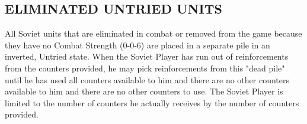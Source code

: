 \subsection{ELIMINATED UNTRIED UNITS}

All Soviet units that are eliminated in combat or removed from the game because they have no Combat Strength (0-0-6) are placed in a separate pile in an inverted, Untried state. When the Soviet Player has run out of reinforcements from the counters provided, he may pick reinforcements from this "dead pile" until he has used all counters available to him and there are no other counters available to him and there are no other counters to use. The Soviet Player is limited to the number of counters he actually receives by the number of counters provided.
